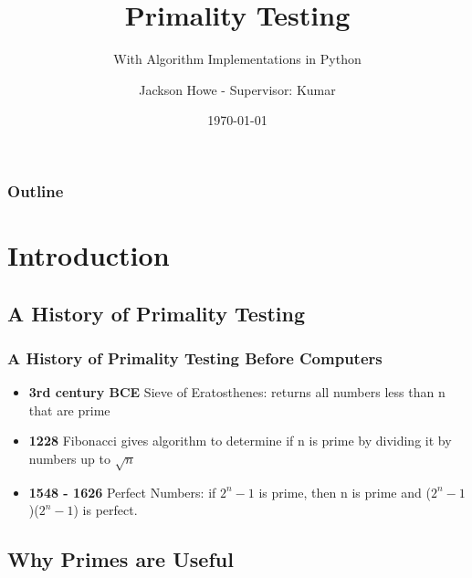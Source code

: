 \documentclass{beamer}
\title{Primality Testing}
\subtitle{With Algorithm Implementations in Python}
\author{Jackson Howe - Supervisor: Kumar}
\institute{Western University}
\date{\today}
\begin{document}
\begin{frame}
\titlepage
\end{frame}

\begin{frame}
\frametitle{Outline}
\tableofcontents
\end{frame}

\section{Introduction}


\subsection{A History of Primality Testing}

\begin{frame}
\frametitle{A History of Primality Testing Before Computers}
\begin{itemize}
    \item \textbf{3rd century BCE} Sieve of Eratosthenes: returns all numbers less than n that are prime
    \item \textbf{1228} Fibonacci gives algorithm to determine if n is prime by dividing it by numbers up to $\sqrt{n}$
    \item \textbf{1548 - 1626} Perfect Numbers: if $2^n - 1$ is prime, then n is prime and ($2^n - 1$)($2^n - 1$) is perfect.
\end{itemize}
\end{frame}

\subsection{Why Primes are Useful}
\end{document}
